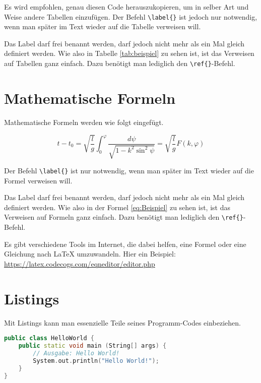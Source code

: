 Es wird empfohlen, genau diesen Code herauszukopieren, um in selber Art und Weise andere Tabellen einzufügen. Der Befehl \texttt{\textbackslash{}label\{\}} ist jedoch nur notwendig, wenn man später im Text wieder auf die Tabelle verweisen will.

Das Label darf frei benannt werden, darf jedoch nicht mehr als ein Mal gleich definiert werden. Wie also in Tabelle \ref{tab:beispiel} zu sehen ist, ist das Verweisen auf Tabellen ganz einfach. Dazu benötigt man lediglich den \texttt{\textbackslash{}ref\{\}}-Befehl.


\section{Mathematische Formeln}
Mathematische Formeln werden wie folgt eingefügt.

\begin{equation}
t-t_{0}=\sqrt{\frac{l}{g}}\int_{0}^{\varphi}{\frac{d\psi}{\sqrt{1-k^{2}\sin^{2} {\psi}}}} = \sqrt{\frac{l}{g}} F(k,\varphi)
\label{eq:Beispiel}
\end{equation}

Der Befehl \texttt{\textbackslash{}label\{\}} ist nur notwendig, wenn man später im Text wieder auf die Formel verweisen will.

Das Label darf frei benannt werden, darf jedoch nicht mehr als ein Mal gleich definiert werden. Wie also in der Formel \ref{eq:Beispiel} zu sehen ist, ist das Verweisen auf Formeln ganz einfach. Dazu benötigt man lediglich den \texttt{\textbackslash{}ref\{\}}-Befehl.

Es gibt verschiedene Tools im Internet, die dabei helfen, eine Formel oder eine Gleichung nach LaTeX umzuwandeln. Hier ein Beispiel: \href{https://latex.codecogs.com/eqneditor/editor.php}{https://latex.codecogs.com/eqneditor/editor.php}


\section{Listings}
Mit Listings kann man essenzielle Teile seines Programm-Codes einbeziehen.

\begin{lstlisting}[caption=Mein Beispiellisting, label=lst:beispiel, language=C++]
public class HelloWorld {
	public static void main (String[] args) {
		// Ausgabe: Hello World!
		System.out.println("Hello World!");
	}
}
\end{lstlisting}

